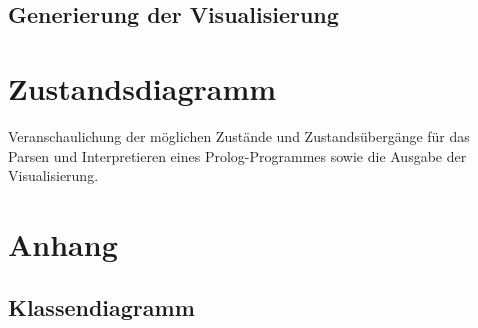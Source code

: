 \documentclass[parskip=full,11pt,twoside]{scrartcl}
\begin{document}
\subsection{Generierung der Visualisierung}

\section{Zustandsdiagramm}
Veranschaulichung der möglichen Zustände und Zustandsübergänge für das Parsen und Interpretieren eines Prolog-Programmes sowie die Ausgabe der Visualisierung.

\appendix

\section{Anhang}

\subsection{Klassendiagramm}
\end{document}
